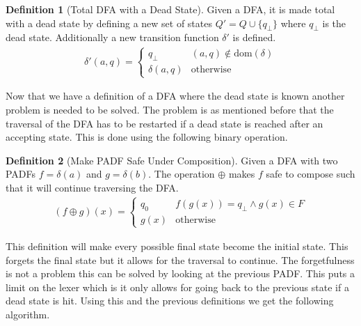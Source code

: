 \documentclass[a4paper,12pt]{article}
\theoremstyle{definition}
\newtheorem{definition}{Definition}[section]
\begin{document}
\begin{definition}[Total DFA with a Dead State]
  Given a DFA, it is made total with a dead state by defining a new set of states $Q' = Q \cup \{q_{\bot}\}$ where $q_{\bot}$ is the dead state. Additionally a new transition function $\delta'$ is defined.
  \begin{align*}
    \delta'(a, q) = \begin{cases}
      q_{\bot} &  (a, q) \notin \text{dom}(\delta) \\
      \delta(a, q) & \text{otherwise}
    \end{cases}
  \end{align*}
\end{definition}
\noindent Now that we have a definition of a DFA where the dead state is known another problem is needed to be solved. The problem is as mentioned before that the traversal of the DFA has to be restarted if a dead state is reached after an accepting state. This is done using the following binary operation.

\begin{definition}[Make PADF Safe Under Composition]
  Given a DFA with two PADFs $f = \delta(a)$ and $g = \delta(b)$. The operation $\oplus$ makes $f$ safe to compose such that it will continue traversing the DFA.
  \begin{align*}
    (f \oplus g)(x) =
    \begin{cases}
      q_0 & f(g(x)) = q_{\bot} \land g(x) \in F \\
      g(x) & \text{otherwise} 
    \end{cases}
  \end{align*}
\end{definition}
\noindent This definition will make every possible final state become the initial state. This forgets the final state but it allows for the traversal to continue. The forgetfulness is not a problem this can be solved by looking at the previous PADF. This puts a limit on the lexer which is it only allows for going back to the previous state if a dead state is hit.
Using this and the previous definitions we get the following algorithm.
\end{document}
